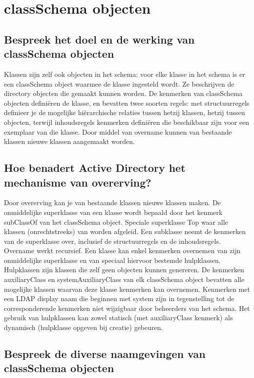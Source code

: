 \chapter{classSchema objecten}

\section{Bespreek het doel en de werking van classSchema objecten}

Klassen zijn zelf ook objecten in het schema: voor elke klasse in het schema is
er een classSchema object waarmee de klasse ingesteld wordt. Ze beschrijven de
directory objecten die gemaakt kunnen worden.
De kenmerken van classSchema objecten definiëren de klasse, en bevatten twee
soorten regels: met structuurregels definieer je de mogelijke hiërarchische
relaties tussen hetzij klassen, hetzij tussen objecten, terwijl inhoudsregels
kenmerken definiëren die beschikbaar zijn voor een exemplaar van die klasse.
Door middel van overname kunnen van bestaande klassen nieuwe klassen aangemaakt
worden.

\section{Hoe benadert Active Directory het mechanisme van overerving?}

Door overerving kan je van bestaande klassen nieuwe klassen maken. De
onmiddelijke superklasse van een klasse wordt bepaald door het kenmerk
subClassOf van het classSchema object. Speciale superklasse Top waar alle
klassen (onrechtstreeks) van worden afgeleid. Een subklasse neemt de kenmerken
van de superklasse over, inclusief de structuurregels en de inhoudsregels.
Overname werkt recursief.
Een klasse kan enkel kenmerken overnemen van zijn onmiddelijke superklasse en
van speciaal hiervoor bestemde hulpklassen. Hulpklassen zijn klassen die zelf
geen objecten kunnen genereren.
De kenmerken auxiliaryClass en systemAuxiliaryClass van elk classSchema object
bevatten alle mogelijke klassen waarvan deze klasse kenmerken kan overnemen.
Kenmerken met een LDAP display naam die beginnen met system zijn in
tegenstelling tot de corresponderende kenmerken niet wijzigbaar door beheerders
van het schema.
Het gebruik van hulpklassen kan zowel statisch (met auxiliaryClass kenmerk) als
dynamisch (hulpklasse opgeven bij creatie) gebeuren.

\section{Bespreek de diverse naamgevingen van classSchema objecten}


